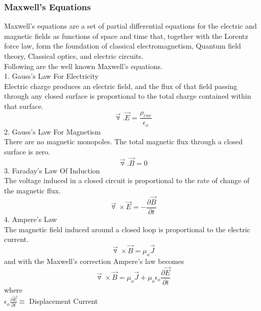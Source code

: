 \documentclass[a4paper, twoside] {thesis}
\begin{document}
\subsubsection{Maxwell's Equations}
Maxwell’s equations are a set of partial differential equations for the electric and magnetic fields as functions of space and time that, together with the Lorentz force law, form the foundation of classical electromagnetism, Quantum field theory, Classical optics, and electric circuits.\\ 
Following are the well known Maxwell's equations.\\
1. Gauss’s Law For Electricity\\
Electric charge produces an electric field, and the flux of that field passing through any closed surface is proportional to the total charge contained within that surface.\\
\begin{equation}
\vec{\triangledown}.\vec{E} = \frac{\rho_{enc}}{\epsilon_{o}}
\end{equation}
2. Gauss’s Law For Magnetism\\
There are no magnetic monopoles. The total magnetic flux through a closed surface is zero.\\
\begin{equation}
\vec{\triangledown}.\vec{B} = 0
\end{equation}
3. Faraday’s Law Of Induction\\
The voltage induced in a closed circuit is proportional to the rate of change of the magnetic flux.\\
\begin{equation}
\vec{\triangledown}\times\vec{E} = - \frac{\partial\vec{B}}{\partial t}
\end{equation}
4. Ampere’s Law\\
The magnetic field induced around a closed loop is proportional to the electric current.\\
\begin{equation}
\vec{\triangledown}\times\vec{B} =\mu_{o}\vec{J}
\end{equation}
and with the Maxwell's correction Ampere's law becomes\\
\begin{equation}
\vec{\triangledown}\times\vec{B} =\mu_{o}\vec{J}+\mu_{o}\epsilon_{o}\frac{\partial\vec{E}}{\partial t}
\end{equation}
where\\

$\epsilon_{o}\frac{\partial\vec{E}}{\partial t}\equiv$ Displacement Current
\end{document}
